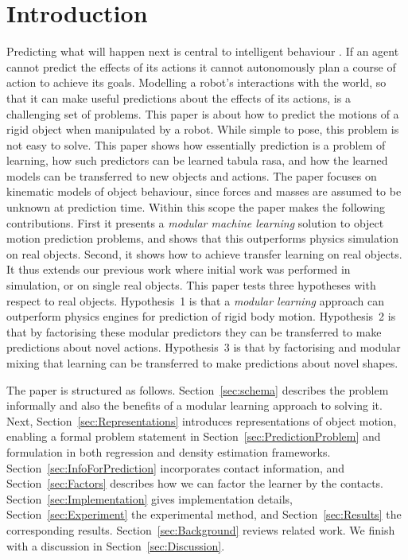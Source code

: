 \section{Introduction}\label{sec:Introduction}

Predicting what will happen next is central to intelligent behaviour \cite{craik1967nature}. If an agent cannot predict the effects of its actions it cannot autonomously plan a course of action to achieve its goals. Modelling a robot's interactions with the world, so that it can make useful predictions about the effects of its actions, is a challenging set of problems. This paper is about how to predict the motions of a rigid object when manipulated by a robot. While simple to pose, this problem is not easy to solve. This paper shows how essentially prediction is a problem of learning, how such predictors can be learned tabula rasa, and how the learned models can be transferred to new objects and actions. The paper focuses on kinematic models of object behaviour, since forces and masses are assumed to be unknown at prediction time. Within this scope the paper makes the following contributions. First it presents a {\em modular machine learning} solution to object motion prediction problems, and shows that this outperforms physics simulation on real objects.  Second, it shows how to achieve transfer learning on real objects. It thus extends our previous work \cite{kopicki_prediction_2009,kopicki_prediction_2010,kopicki-etal-icra11,moerwald11predicting}  where initial work was performed in simulation, or on single real objects.  This paper tests three hypotheses with respect to real objects. Hypothesis~1 is that a {\em modular learning} approach can outperform physics engines for prediction of rigid body motion.  Hypothesis~2 is that by factorising these modular predictors they can be transferred to make predictions about novel actions. Hypothesis~3 is that by factorising and modular mixing that learning can be transferred  to make predictions about novel shapes.

The paper is structured as follows.  Section~\ref{sec:schema} describes the problem informally and also the benefits of a modular learning approach to solving it. Next, Section~\ref{sec:Representations} introduces representations of object motion, enabling a formal problem statement in Section~\ref{sec:PredictionProblem} and formulation in both regression and density estimation frameworks. Section~\ref{sec:InfoForPrediction} incorporates contact information, and Section~\ref{sec:Factors} describes how we can factor the learner by the contacts. Section~\ref{sec:Implementation} gives implementation details, Section~\ref{sec:Experiment} the experimental method, and Section~\ref{sec:Results}
the corresponding results. Section~\ref{sec:Background} reviews related work.  We finish with a discussion in Section~\ref{sec:Discussion}.